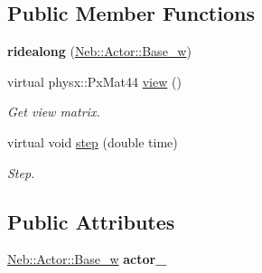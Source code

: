 \subsection*{\-Public \-Member \-Functions}
\begin{DoxyCompactItemize}
\item 
\hypertarget{classNeb_1_1Camera_1_1View_1_1ridealong_a36318db75be6a5540df20bc5bd0a229b}{{\bfseries ridealong} (\hyperlink{classNeb_1_1weak__ptr}{\-Neb\-::\-Actor\-::\-Base\-\_\-w})}\label{classNeb_1_1Camera_1_1View_1_1ridealong_a36318db75be6a5540df20bc5bd0a229b}

\item 
\hypertarget{classNeb_1_1Camera_1_1View_1_1ridealong_a4ee5eeec5dffa25ddf28d8cfc89a35c8}{virtual physx\-::\-Px\-Mat44 \hyperlink{classNeb_1_1Camera_1_1View_1_1ridealong_a4ee5eeec5dffa25ddf28d8cfc89a35c8}{view} ()}\label{classNeb_1_1Camera_1_1View_1_1ridealong_a4ee5eeec5dffa25ddf28d8cfc89a35c8}

\begin{DoxyCompactList}\small\item\em \-Get view matrix. \end{DoxyCompactList}\item 
virtual void \hyperlink{classNeb_1_1Camera_1_1View_1_1ridealong_a4ab29cdafb2d4ba835485f47d41ae2b6}{step} (double time)
\begin{DoxyCompactList}\small\item\em \-Step. \end{DoxyCompactList}\end{DoxyCompactItemize}
\subsection*{\-Public \-Attributes}
\begin{DoxyCompactItemize}
\item 
\hypertarget{classNeb_1_1Camera_1_1View_1_1ridealong_a12c226e2d3a487847acec2ff3e5d8457}{\hyperlink{classNeb_1_1weak__ptr}{\-Neb\-::\-Actor\-::\-Base\-\_\-w} {\bfseries actor\-\_\-}}\label{classNeb_1_1Camera_1_1View_1_1ridealong_a12c226e2d3a487847acec2ff3e5d8457}

\end{DoxyCompactItemize}


